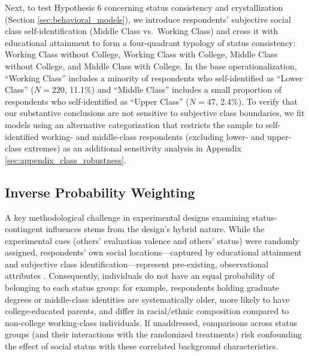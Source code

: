\documentclass[12pt, letterpaper]{article}
\begin{document}
Next, to test Hypothesis 6 concerning status consistency and crystallization (Section \ref{sec:behavioral_models}), we introduce respondents' subjective social class self-identification (Middle Class vs.\ Working Class) and cross it with educational attainment to form a four-quadrant typology of status consistency: Working Class without College, Working Class with College, Middle Class without College, and Middle Class with College. In the base operationalization, ``Working Class'' includes a minority of respondents who self-identified as ``Lower Class'' ($N = 220$, 11.1\%) and ``Middle Class'' includes a small proportion of respondents who self-identified as ``Upper Class'' ($N = 47$, 2.4\%). To verify that our substantive conclusions are not sensitive to subjective class boundaries, we fit models using an alternative categorization that restricts the sample to self-identified working- and middle-class respondents (excluding lower- and upper-class extremes) as an additional sensitivity analysis in Appendix \ref{sec:appendix_class_robustness}.

\subsection{Inverse Probability Weighting}
A key methodological challenge in experimental designs examining status-contingent influences stems from the design's hybrid nature. While the experimental cues (others' evaluation valence and others' status) were randomly assigned, respondents' own social locations—captured by educational attainment and subjective class identification—represent pre-existing, observational attributes \citep{cruces2013biases}. Consequently, individuals do not have an equal probability of belonging to each status group: for example, respondents holding graduate degrees or middle-class identities are systematically older, more likely to have college-educated parents, and differ in racial/ethnic composition compared to non-college working-class individuals. If unaddressed, comparisons across status groups (and their interactions with the randomized treatments) risk confounding the effect of social status with these correlated background characteristics.
\end{document}
